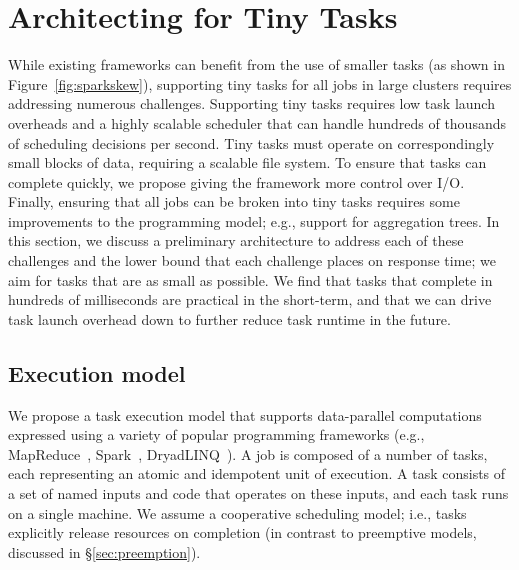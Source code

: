 \section{Architecting for Tiny Tasks}
\label{sec:architecture}

While existing frameworks can benefit from the use of smaller tasks (as shown
in Figure~\ref{fig:sparkskew}), supporting tiny tasks for all jobs in large clusters
requires addressing numerous challenges.
Supporting tiny tasks requires low task launch overheads and a highly scalable scheduler that can
handle hundreds of thousands of scheduling decisions per second. %
Tiny tasks must operate on correspondingly
small blocks of data, requiring a scalable file system. To ensure that
tasks can complete quickly, we propose giving the framework more control
over I/O. %
Finally, ensuring
that all jobs can be broken into tiny tasks requires some improvements
to the programming model; e.g., support for aggregation trees.
In this section, we discuss a preliminary architecture to address
each of these challenges and the lower bound that each challenge places
on response time; we aim for tasks that are as small as possible.
We find that tasks that complete in hundreds of milliseconds
are practical in the short-term, and that we can drive task launch overhead
down to further reduce task runtime in the future.

\subsection{Execution model}
We propose a task execution model that supports data-parallel computations
expressed using a variety of popular programming frameworks (e.g.,
MapReduce~\cite{dean2008mapreduce}, Spark~\cite{zaharia2010spark},
DryadLINQ~\cite{yu2008dryadlinq}).
A job is composed of a number of tasks, each representing an atomic
and idempotent unit of execution. A task consists of a set of named inputs
and code that operates on these inputs, and each task runs on a single machine.
We assume a cooperative scheduling model; i.e., tasks explicitly release
resources on completion (in contrast to preemptive models, discussed in
\S\ref{sec:preemption}).


